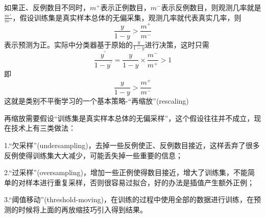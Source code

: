\documentclass[UTF8]{article}
\begin{document}
如果正、反例数目不同时，$m^{+}$表示正例数目，$m^{-}$表示反例数目，则观测几率就是$\frac{m^{+}}{m^{-}}$，假设训练集是真实样本总体的无偏采集，观测几率就代表真实几率，则$$\frac{y}{1-y} > \frac{m^{+}}{m^{-}}$$
表示预测为正。实际中分类器基于原始的$\frac{y}{1-y}$进行决策，这时只需
$$\frac{y^{\prime}}{1-y^{\prime}} = \frac{y}{1-y} \times \frac{m^{-}}{m^{+}} > 1$$
即
$$\frac{y}{1-y} > \frac{m^{+}}{m^{-}}$$
这就是类别不平衡学习的一个基本策略-“再缩放”(rescaling)

再缩放需要假设“训练集是真实样本总体的无偏采样”，这个假设往往并不成立，现在技术上有三类做法：

1.“欠采样”(undersampling)，去掉一些反例使正、反例数目接近，这样丢弃了很多反例使得训练集大大减少，可能丢失掉一些重要的信息；

2.“过采样”(oversampling)，增加一些正例使得数目接近，增大了训练集，不能简单的对样本进行重复采样，否则很容易过拟合，好的办法是插值产生额外正例；

3.“阈值移动”(threshold-moving)，在训练的过程中使用全部的数据进行训练，在预测的时候将上面的再放缩技巧引入得到结果。
\end{document}
